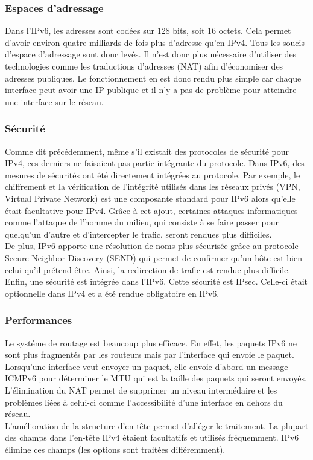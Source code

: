 \subsubsection{Espaces d'adressage}
Dans l'IPv6, les adresses sont codées sur 128 bits, soit 16 octets. Cela permet d'avoir 
environ quatre milliards de fois plus d'adresse qu'en IPv4. Tous les soucis d'espace d'adressage sont donc levés. Il n'est donc plus nécessaire d'utiliser des technologies comme les traductions d'adresses
(NAT) afin d'économiser des adresses publiques. Le fonctionnement en est donc rendu plus simple car 
chaque interface peut avoir une IP publique et il n'y a pas de problème pour atteindre une interface sur le réseau.
\subsubsection{Sécurité}
Comme dit précédemment, même s'il existait des protocoles de sécurité pour IPv4, 
ces derniers ne faisaient pas partie intégrante du protocole.
Dans IPv6, des mesures de sécurités ont été directement intégrées au protocole.
Par exemple, le chiffrement et la vérification de l'intégrité utilisés dans les réseaux privés 
(VPN, Virtual Private Network) est une composante standard pour IPv6 alors qu'elle était 
facultative pour IPv4. Grâce à cet ajout, certaines attaques informatiques comme l'attaque de 
l'homme du milieu, qui consiste à se faire passer pour quelqu'un d'autre et d'intercepter 
le trafic, seront rendues plus difficiles.
\\
De plus, IPv6 apporte une résolution de noms plus sécurisée grâce au protocole Secure Neighbor
Discovery (SEND) qui permet de confirmer qu'un hôte est bien celui qu'il prétend être. Ainsi, la redirection de trafic est rendue plus difficile.
\\
Enfin, une sécurité est intégrée dans l'IPv6. Cette sécurité est IPsec. Celle-ci était optionnelle 
dans IPv4 et a été rendue obligatoire en IPv6.
\subsubsection{Performances}

Le systéme de routage est beaucoup plus efficace. En effet, les paquets IPv6 ne sont plus
fragmentés par les routeurs mais par l'interface qui envoie le paquet. Lorsqu'une interface
veut envoyer un paquet, elle envoie d'abord un message ICMPv6 pour déterminer le MTU qui est 
la taille des paquets qui seront envoyés.
\\
L'élimination du NAT permet de supprimer un niveau intermédaire et les problèmes liées à celui-ci
 comme l'accessibilité d'une interface en dehors du réseau.
\\	
L'amélioration de la structure d'en-tête permet d'alléger le traitement. La
plupart des champs dans l'en-tête IPv4 étaient facultatifs et utilisés
fréquemment. IPv6 élimine ces champs (les options sont traitées différemment).
